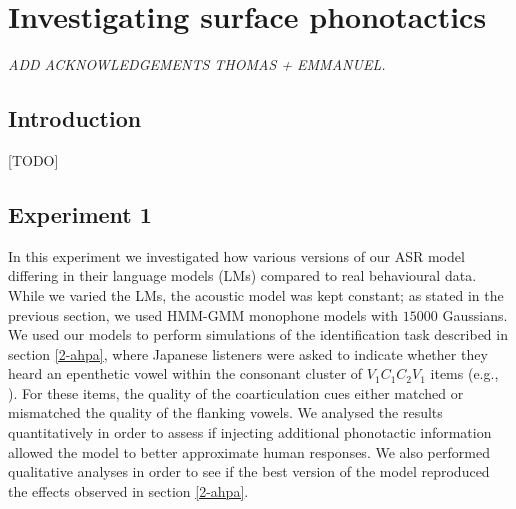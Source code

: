 

\newpage
\section{{\color{red}Investigating surface phonotactics}} \label{3-surfphono}

\small{\textit{{\color{red}ADD ACKNOWLEDGEMENTS THOMAS + EMMANUEL.\\}}}

\subsection{Introduction}

{\color{red}[TODO]}



\subsection{Experiment 1}%
In this experiment we investigated how various versions of our ASR model differing in their language models (LMs) compared to real behavioural data. While we varied the LMs, the acoustic model was kept constant; as stated in the previous section, we used HMM-GMM monophone models with $15000$ Gaussians. We used our models to perform simulations of the identification task described in section \ref{2-ahpa}, where Japanese listeners were asked to indicate whether they heard an epenthetic vowel within the consonant cluster of $V_{1}C_{1}C_{2}V_{1}$ items (e.g., ). For these items, the quality of the coarticulation cues either matched or mismatched the quality of the flanking vowels. We analysed the results quantitatively in order to assess if injecting additional phonotactic information allowed the model to better approximate human responses. We also performed qualitative analyses in order to see if the best version of the model reproduced the effects observed in section \ref{2-ahpa}. 

